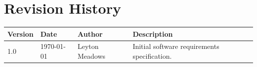 \section{Revision History}

\begin{longtable}{|p{}|p{}|p{}|p{}|}
\hline
\textbf{Version} & \textbf{Date} & \textbf{Author} & \textbf{Description} \\
\hline
1.0 & \today & Leyton Meadows & Initial software requirements specification. \\
\hline
\end{longtable}
